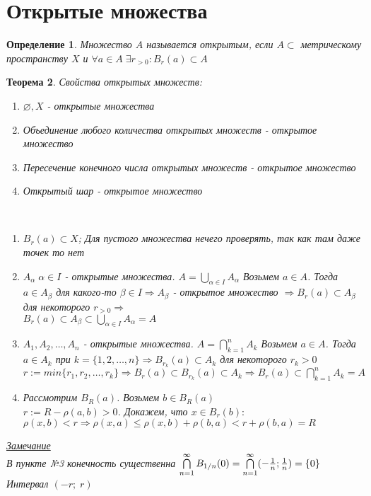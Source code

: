 \documentclass[12pt,letterpaper]{report}
\makeatletter
\newtheorem{theorem}{Теорема}
\newtheorem{conj}[theorem]{Определение}
\newcommand{\notice}{\underline{\textit{Замечание }}}
\renewenvironment{proof}[1][\proofname]{%
   \par\pushQED{\qed}\normalfont%
   \topsep6\p@\@plus6\p@\relax
   \trivlist\item[\hskip\labelsep\bfseries#1\@addpunct{.}]%
   \ignorespaces
}{%
   \popQED\endtrivlist\@endpefalse
}
\makeatother
\begin{document}
\section{Открытые множества}
\begin{conj}
    Множество $A$ называется открытым, если $A \subset $ метрическому пространству $X$ и $\forall a \in A \; \exists r_{>0} : B_r(a) \subset A$
\end{conj}
\begin{theorem}
    Свойства открытых множеств:
    \begin{enumerate}
        \item $\varnothing, X$ - открытые множества 
        \item Объединение любого количества открытых множеств - открытое множество
        \item Пересечение конечного числа открытых множеств - открытое множество
        \item Открытый шар - открытое множество
    \end{enumerate}
    \begin{proof}
        \quad \\
        \begin{enumerate}
            \item $B_r(a) \subset X$; Для пустого множества нечего проверять, так как там даже точек то нет
            \item $A_{\alpha} \; \alpha \in I$ - открытые множества. $A = \bigcup\limits_{\alpha \in I} A_{\alpha}$ 
            Возьмем $a \in A$. Тогда $a \in A_{\beta}$ для какого-то $\beta \in I \Longrightarrow A_{\beta}$ - открытое множество 
            $\Longrightarrow B_r(a) \subset A_{\beta}$ для некоторого $r_{>0} \Longrightarrow$ \\
            $B_r(a) \subset A_{\beta} \subset \bigcup\limits_{\alpha \in I} A_{\alpha} = A$
            \item $A_1, A_2, \dots , A_n$ - открытые множества. $A = \bigcap\limits_{k = 1}^{n} A_k$
            Возьмем $a \in A$. Тогда $a \in A_k$ при $k = \{1, 2, \dots , n\} \Longrightarrow
            B_{r_k}(a) \subset A_k$ для некоторого $r_k > 0$ \\
            $r := min\{r_1, r_2, \dots , r_k\} \Longrightarrow B_r(a) \subset B_{r_k}(a) \subset A_k 
            \Longrightarrow B_r(a) \subset \bigcap\limits_{k=1}^n A_k = A$
            \item Рассмотрим $B_R(a)$. Возьмем $b \in B_R(a)$ \\
            $r := R-\rho(a, b) > 0$.
            Докажем, что $x \in B_r(b):$ \\
            $\rho(x, b) < r \Longrightarrow \rho(x,a) \leqslant \rho(x, b) + \rho(b,a) < r + \rho(b,a) = R$
        \end{enumerate}
    \end{proof}
    \notice \\
    В пункте №3 конечность существенна
    $\bigcap\limits_{n=1}^{\infty} B_{1/n}(0) = \bigcap\limits_{n=1}^{\infty}(-{{1}\over{n}}; {{1}\over{n}}) = \{0\}$ Интервал $(-r; \; r)$
\end{theorem}
\end{document}
